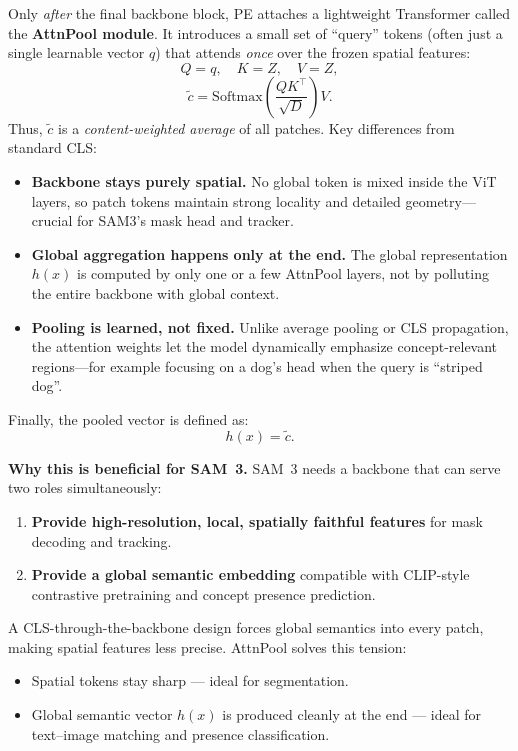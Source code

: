 \begin{enrichment}
\begin{enrichment}
\begin{itemize}
	       Only \emph{after} the final backbone block, PE attaches a lightweight
	       Transformer called the \textbf{AttnPool module}. It introduces a small set of
	       ``query'' tokens (often just a single learnable vector $q$) that attends
	       \emph{once} over the frozen spatial features:
	       \[
	       Q = q,\quad K = Z,\quad V = Z,
	       \]
	       \[
	       \tilde{c} = \text{Softmax}\!\left(\frac{QK^\top}{\sqrt{D}}\right) V.
	       \]
	       Thus, $\tilde{c}$ is a \emph{content-weighted average} of all patches.
	       Key differences from standard CLS:
	       \begin{itemize}
	       	\item \textbf{Backbone stays purely spatial.} No global token is mixed inside
	       	the ViT layers, so patch tokens maintain strong locality and detailed
	       	geometry—crucial for SAM3's mask head and tracker.
	       	\item \textbf{Global aggregation happens only at the end.}
	       	The global representation $h(x)$ is computed by only one or a few
	       	AttnPool layers, not by polluting the entire backbone with global
	       	context.
	       	\item \textbf{Pooling is learned, not fixed.}
	       	Unlike average pooling or CLS propagation, the attention weights let
	       	the model dynamically emphasize concept-relevant regions—for example
	       	focusing on a dog’s head when the query is “striped dog”.
	       \end{itemize}
	       Finally, the pooled vector is defined as:
	       \[
	       h(x) = \tilde{c}.
	       \]
	       
	       \newpage
	       
	       \noindent\textbf{Why this is beneficial for SAM~3.}
	       SAM~3 needs a backbone that can serve two roles simultaneously:
	       \begin{enumerate}
	       	\item \textbf{Provide high-resolution, local, spatially faithful features} for
	       	mask decoding and tracking.
	       	\item \textbf{Provide a global semantic embedding} compatible with CLIP-style
	       	contrastive pretraining and concept presence prediction.
	       \end{enumerate}
	       
	       A CLS-through-the-backbone design forces global semantics into every patch,
	       making spatial features less precise. AttnPool solves this tension:
	       \begin{itemize}
	       	\item Spatial tokens stay sharp --- ideal for segmentation.
	       	\item Global semantic vector $h(x)$ is produced cleanly at the end --- ideal
	       	for text–image matching and presence classification.
	       \end{itemize}
	       

\end{itemize}
\end{enrichment}
\end{enrichment}
